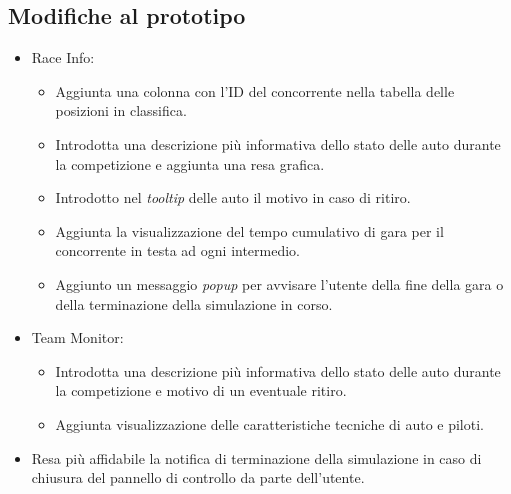 \subsection*{Modifiche al prototipo}
\begin{itemize}
\item Race Info:
	\begin{itemize}
	\item Aggiunta una colonna con l'ID del concorrente nella tabella delle posizioni in classifica.
	\item Introdotta una descrizione più informativa dello stato delle auto durante la competizione e aggiunta una resa grafica.
	\item Introdotto nel \textit{tooltip} delle auto il motivo in caso di ritiro.
	\item Aggiunta la visualizzazione del tempo cumulativo di gara per il concorrente in testa ad ogni intermedio.
	\item Aggiunto un messaggio \textit{popup} per avvisare l'utente della fine della gara o della terminazione della simulazione in corso.
	\end{itemize}
\item Team Monitor:
	\begin{itemize}
	\item Introdotta una descrizione più informativa dello stato delle auto durante la competizione e motivo di un eventuale ritiro.
	\item Aggiunta visualizzazione delle caratteristiche tecniche di auto e piloti.
	\end{itemize}
\item Resa più affidabile la notifica di terminazione della simulazione in caso di chiusura del pannello di controllo da parte dell'utente.
\end{itemize}
